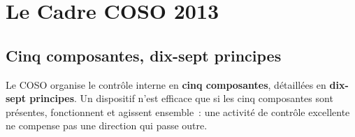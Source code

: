\section{Le Cadre COSO 2013}
\label{sec:c03-coso}

\subsection{Cinq composantes, dix-sept principes}

Le COSO organise le contrôle interne en \textbf{cinq composantes}, détaillées
en \textbf{dix-sept principes}. Un dispositif n'est efficace que si les cinq
composantes sont présentes, fonctionnent et agissent ensemble~: une
activité de contrôle excellente ne compense pas une direction qui passe
outre.

